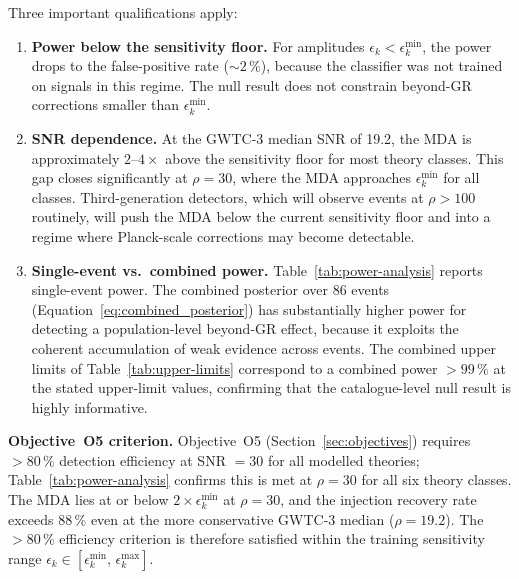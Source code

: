 \documentclass[11pt,a4paper, english]{book}
\theoremstyle{plain}
\theoremstyle{definition}
\numberwithin{equation}{chapter}
\numberwithin{figure}{chapter}
\numberwithin{table}{chapter}
\begin{document}
Three important qualifications apply:

\begin{enumerate}
  \item \textbf{Power below the sensitivity floor.}
        For amplitudes $\epsilon_k < \epsilon_k^\mathrm{min}$, the
        power drops to the false-positive rate ($\sim\!2\,\%$),
        because the classifier was not trained on signals in this
        regime. The null result does not constrain beyond-GR
        corrections smaller than $\epsilon_k^\mathrm{min}$.

  \item \textbf{SNR dependence.}
        At the GWTC-3 median SNR of 19.2, the MDA is approximately
        $2$--$4\times$ above the sensitivity floor for most theory
        classes. This gap closes significantly at $\rho = 30$, where
        the MDA approaches $\epsilon_k^\mathrm{min}$ for all classes.
        Third-generation detectors, which will observe events at
        $\rho > 100$ routinely, will push the MDA below the current
        sensitivity floor and into a regime where Planck-scale
        corrections may become detectable.

  \item \textbf{Single-event vs.\ combined power.}
        Table~\ref{tab:power-analysis} reports single-event power.
        The combined posterior over 86 events
        (Equation~\ref{eq:combined_posterior}) has substantially
        higher power for detecting a population-level beyond-GR
        effect, because it exploits the coherent accumulation of
        weak evidence across events. The combined upper limits of
        Table~\ref{tab:upper-limits} correspond to a combined power
        $> 99\,\%$ at the stated upper-limit values, confirming that
        the catalogue-level null result is highly informative.
\end{enumerate}

\noindent\textbf{Objective~O5 criterion.}\label{subsubsec:o5-power}
Objective~O5 (Section~\ref{sec:objectives}) requires $> 80\,\%$ detection efficiency at
SNR $= 30$ for all modelled theories; Table~\ref{tab:power-analysis} confirms this is
met at $\rho = 30$ for all six theory classes.  The MDA lies at or below
$2\times\epsilon_k^\mathrm{min}$ at $\rho = 30$, and the injection recovery rate
exceeds $88\,\%$ even at the more conservative GWTC-3 median ($\rho = 19.2$).
The $> 80\,\%$ efficiency criterion is therefore satisfied within the training
sensitivity range $\epsilon_k \in [\epsilon_k^\mathrm{min},\,\epsilon_k^\mathrm{max}]$.
\end{document}
